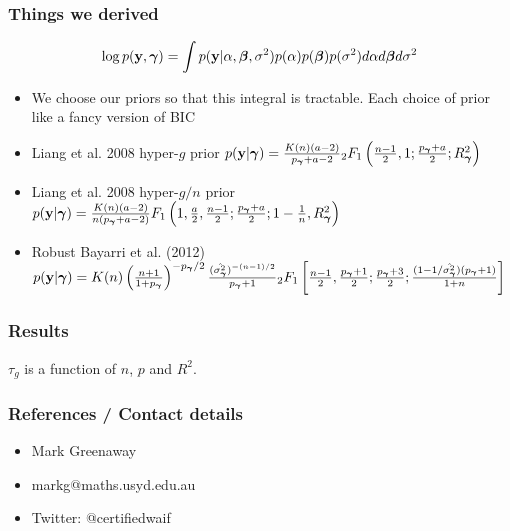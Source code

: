 \documentclass{beamer}
\begin{document}
\begin{frame}
	\frametitle{Things we derived}
	$$\log p({\bf y}, {\boldsymbol \gamma}) = \int p({\bf y} | \alpha, {\boldsymbol \beta}, \sigma^2) p(\alpha) p({\boldsymbol \beta}) p(\sigma^2) d \alpha d {\boldsymbol \beta} d \sigma^2$$
	\begin{itemize}
		\item We choose our priors so that this integral is tractable. Each choice of prior like a fancy version of BIC
		\item Liang et al. 2008 hyper-$g$ prior \citep{Liang2008}
			$p({\bf y} | {\boldsymbol \gamma}) = \frac{K(n) (a - 2)}{p_{\boldsymbol \gamma} + a  - 2} {}_2 F_1 \left( \frac{n-1}{2}, 1; \frac{p_{\boldsymbol \gamma} + a}{2}; R_{\boldsymbol \gamma}^2 \right)$
		\item Liang et al. 2008 hyper-$g/n$ prior \citep{Liang2008}
			$p({\bf y} | {\boldsymbol \gamma}) = \frac{K(n) (a - 2)}{n (p_{\boldsymbol \gamma} + a  - 2)} F_1 \left( 1, \frac{a}{2}, \frac{n-1}{2}; \frac{p_{\boldsymbol \gamma} + a}{2}; 1 - \frac{1}{n}, R_{\boldsymbol \gamma}^2 \right)$
		\item Robust Bayarri et al. (2012) \citep{Bayarri2012}
			$p({\bf y} | {\boldsymbol \gamma}) = K(n) \left(\frac{n + 1}{1 + p_{\boldsymbol \gamma}}\right)^{-p_{\boldsymbol \gamma}/2} \frac{(\hat{\sigma_{\boldsymbol \gamma}^2})^{-(n-1)/2}}{p_{\boldsymbol \gamma} + 1} {}_2 F_1 \left[ \frac{n-1}{2}, \frac{p_{\boldsymbol \gamma}+1}{2}; \frac{p_{\boldsymbol \gamma} + 3}{2}; \frac{(1 - 1/\hat{\sigma_{\boldsymbol \gamma}^2})(p_{\boldsymbol \gamma} + 1)}{1 + n} \right]$
	\end{itemize}
\end{frame}

\begin{frame}
	\frametitle{Results}
	$\tau_g$ is a function of $n$, $p$ and $R^2$.
\end{frame}

\begin{frame}
	\frametitle{References / Contact details}
	\begin{itemize}
		\item Mark Greenaway
		\item markg@maths.usyd.edu.au
		\item Twitter: @certifiedwaif	
	\end{itemize}
	
	
\end{frame}
\end{document}
